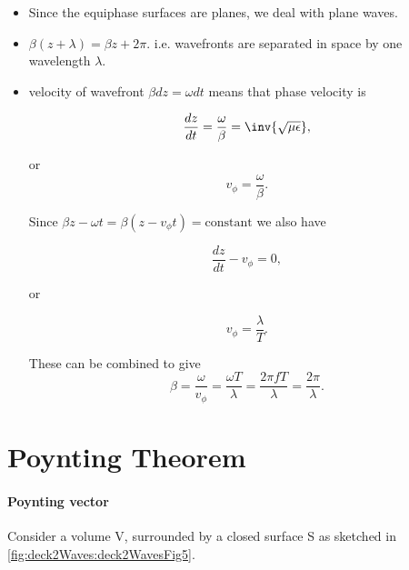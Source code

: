 \begin{itemize}
\item Since the equiphase surfaces are planes, we deal with plane waves.
\item \( \beta( z + \lambda ) = \beta z + 2 \pi \).  i.e. wavefronts are separated in space by one wavelength \( \lambda \).
\item velocity of wavefront \( \beta dz = \omega dt \) means that phase velocity is

\begin{equation}\label{eqn:uwavesLecture2:1100}
\frac{dz}{dt} = \frac{\omega}{\beta} = \inv{\sqrt{\mu \epsilon} },
\end{equation}

or 
\begin{dmath}\label{eqn:uwavesDeck2WaveEquationCore:1500}
v_\phi = \frac{\omega}{\beta}.
\end{dmath}

Since \( \beta z - \omega t = \beta ( z - v_\phi t ) = \textrm{constant} \) we also have

\begin{dmath}\label{eqn:uwavesDeck2WaveEquationCore:1520}
\frac{dz}{dt} - v_\phi = 0,
\end{dmath}

or

\begin{dmath}\label{eqn:uwavesDeck2WaveEquationCore:1540}
v_\phi = \frac{\lambda}{T}.
\end{dmath}

These can be combined to give
\begin{dmath}\label{eqn:uwavesDeck2WaveEquationCore:1560}
\beta 
= \frac{\omega}{v_\phi} 
= \frac{\omega T}{\lambda}
= \frac{2 \pi f T}{\lambda}
= \frac{2 \pi}{\lambda}.
\end{dmath}
 
\end{itemize}

\section{Poynting Theorem}

\paragraph{Poynting vector}

Consider a volume V, surrounded by a closed surface S as sketched in \cref{fig:deck2Waves:deck2WavesFig5}.

